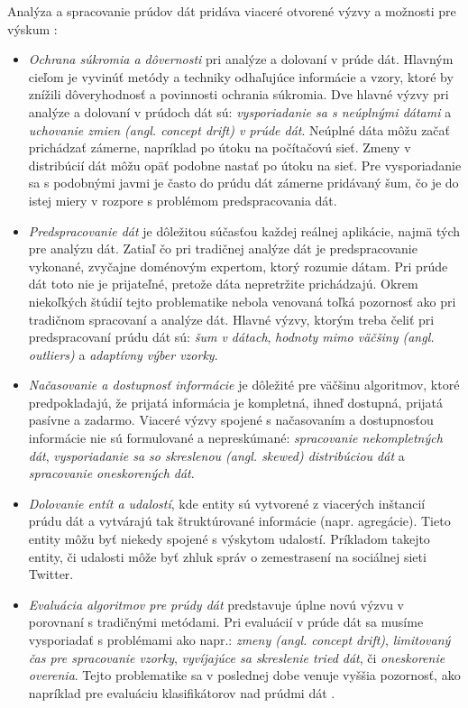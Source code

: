 Analýza a spracovanie prúdov dát pridáva viaceré otvorené výzvy a možnosti pre výskum \citep{krempl2014open}:
\begin{itemize}
	\item \textit{Ochrana súkromia a dôvernosti} pri analýze a dolovaní v prúde dát. Hlavným cieľom je vyvinúť metódy a techniky odhaľujúce informácie a vzory, ktoré by znížili dôveryhodnosť a povinnosti ochrania súkromia. Dve hlavné výzvy pri analýze a dolovaní v prúdoch dát sú: \textit{vysporiadanie sa s neúplnými dátami} a \textit{uchovanie zmien (angl. concept drift) v prúde dát}. Neúplné dáta môžu začať prichádzať zámerne, napríklad po útoku na počítačovú sieť. Zmeny v distribúcií dát môžu opäť podobne nastať po útoku na sieť. Pre vysporiadanie sa s podobnými javmi je často do prúdu dát zámerne pridávaný šum, čo je do istej miery v rozpore s problémom predspracovania dát.
	\item \textit{Predspracovanie dát} je dôležitou súčasťou každej reálnej aplikácie, najmä tých pre analýzu dát. Zatiaľ čo pri tradičnej analýze dát je predspracovanie vykonané, zvyčajne doménovým expertom, ktorý rozumie dátam. Pri prúde dát toto nie je prijateľné, pretože dáta nepretržite prichádzajú. Okrem niekoľkých štúdií \citep{zliobaite2014adaptive, anagnostopoulos2008deciding} tejto problematike nebola venovaná toľká pozornosť ako pri tradičnom spracovaní a analýze dát. Hlavné výzvy, ktorým treba čeliť pri predspracovaní prúdu dát sú: \textit{šum v dátach}, \textit{hodnoty mimo väčšiny (angl. outliers)} a \textit{adaptívny výber vzorky}.
	\item \textit{Načasovanie a dostupnosť informácie} je dôležité pre väčšinu algoritmov, ktoré predpokladajú, že prijatá informácia je kompletná, ihneď dostupná, prijatá pasívne a zadarmo. Viaceré výzvy spojené s načasovaním a dostupnosťou informácie nie sú formulované a nepreskúmané: \textit{spracovanie nekompletných dát}, \textit{vysporiadanie sa so skreslenou (angl. skewed) distribúciou dát} a \textit{spracovanie oneskorených dát}.
	\item \textit{Dolovanie entít a udalostí}, kde entity sú vytvorené z viacerých inštancií prúdu dát a vytvárajú tak štruktúrované informácie (napr. agregácie). Tieto entity môžu byť niekedy spojené s výskytom udalostí. Príkladom takejto entity, či udalosti môže byť zhluk správ o zemestrasení na sociálnej sieti Twitter. 
	\item \textit{Evaluácia algoritmov pre prúdy dát} predstavuje úplne novú výzvu v porovnaní s tradičnými metódami. Pri evaluácií v prúde dát sa musíme vysporiadať s problémami ako napr.: \textit{zmeny (angl. concept drift)}, \textit{limitovaný čas pre spracovanie vzorky}, \textit{vyvíjajúce sa skreslenie tried dát}, či \textit{oneskorenie overenia}. Tejto problematike sa v poslednej dobe venuje vyššia pozornosť, ako napríklad pre evaluáciu klasifikátorov nad prúdmi dát \citep{bifet2015efficient}.
\end{itemize}

